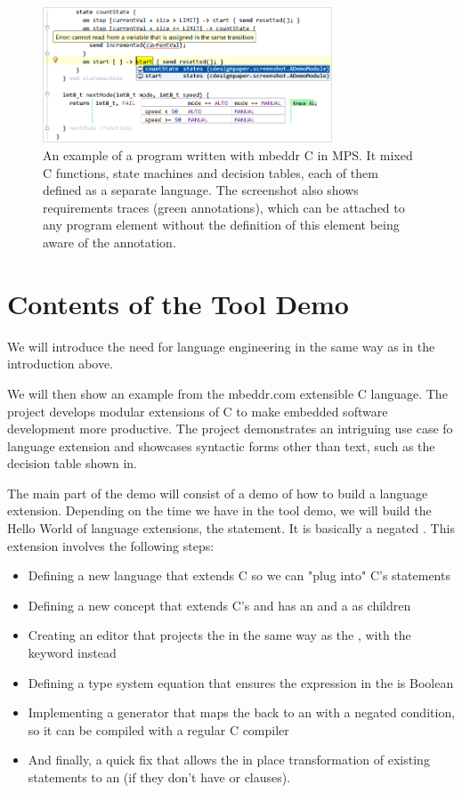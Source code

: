 \documentclass[10pt, conference, compsocconf]{IEEEtran}
\begin{document}
\begin{figure}[h]  
\includegraphics[width=8.6cm]{figures/screenshot.png}
\caption{An example of a program written with mbeddr C in MPS. It mixed C
functions, state machines and decision tables, each of them defined as a separate
language. The screenshot also shows requirements traces (green annotations),
which can be attached to any program element without the definition of this
element being aware of the annotation.}
\label{screenshot}
\end{figure}

\section{Contents of the Tool Demo}

 We will introduce the need for language engineering in
the same way as in the introduction above. 

 We will then show an example from the mbeddr.com
extensible C language. The project develops modular extensions of
C to make embedded software development more productive. The project
demonstrates an intriguing use case fo language extension and showcases
syntactic forms other than text, such as the decision table shown in.

 The main part of the demo will consist of a demo of how
to build a language extension. Depending on the time we have in the tool demo,
we will build the Hello World of language extensions, the  statement.
It is basically a negated . This extension involves the following steps:

\begin{itemize}
  \item Defining a new language that extends C so we can "plug into" C's
  statements
  \item Defining a new concept  that extends C's
   and has an  and a  as children
  \item Creating an editor that projects the  in the same
  way as the , with the keyword  instead
  \item Defining a type system equation that ensures the expression in the
   is Boolean
  \item Implementing a generator that maps the  back to an 
  with a negated condition, so it can be compiled with a regular C compiler
  \item And finally, a quick fix that allows the in place transformation of
  existing  statements to an  (if they don't have  or  clauses).
\end{itemize}
\end{document}
